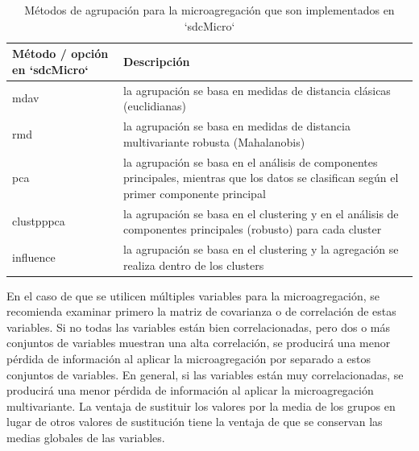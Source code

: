 \documentclass[]{book}
\theoremstyle{definition}
\theoremstyle{definition}
\theoremstyle{definition}
\theoremstyle{definition}
\theoremstyle{remark}
\begin{document}
\begin{table}

\caption{\label{tab:Tabla18}\label{tab:Tabla18}Métodos de agrupación para la microagregación que son implementados en `sdcMicro`}
\centering
\begin{tabular}[t]{ll}
\toprule
Método / opción en `sdcMicro` & Descripción\\
\midrule
mdav & la agrupación se basa en medidas de distancia clásicas (euclidianas)\\
rmd & la agrupación se basa en medidas de distancia multivariante robusta (Mahalanobis)\\
pca & la agrupación se basa en el análisis de componentes principales, mientras que los datos se clasifican según el primer componente principal\\
clustpppca & la agrupación se basa en el clustering y en el análisis de componentes   principales (robusto) para cada cluster\\
influence & la agrupación se basa en el clustering y la agregación se realiza dentro de los clusters\\
\bottomrule
\end{tabular}
\end{table}

En el caso de que se utilicen múltiples variables para la microagregación, se recomienda examinar primero la matriz de covarianza o de correlación de estas variables. Si no todas las variables están bien correlacionadas, pero dos o más conjuntos de variables muestran una alta correlación, se producirá una menor pérdida de información al aplicar la microagregación por separado a estos conjuntos de variables. En general, si las variables están muy correlacionadas, se producirá una menor pérdida de información al aplicar la microagregación multivariante. La ventaja de sustituir los valores por la media de los grupos en lugar de otros valores de sustitución tiene la ventaja de que se conservan las medias globales de las variables.
\end{document}
